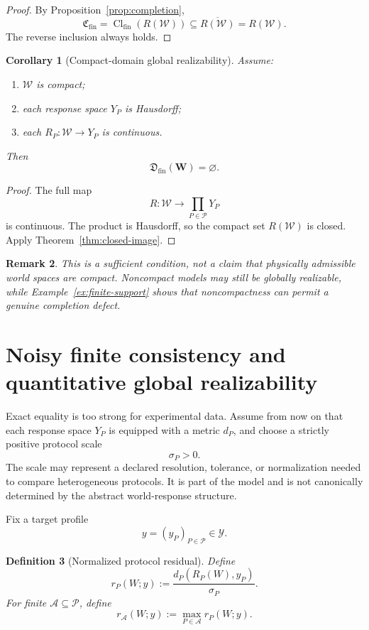 \documentclass[11pt]{article}
\newtheorem{definition}{Definition}[section]
\newtheorem{corollary}[definition]{Corollary}
\newtheorem{remark}[definition]{Remark}
\newcommand{\W}{\mathcal W}
\newcommand{\Pcal}{\mathcal P}
\newcommand{\Acal}{\mathcal A}
\newcommand{\Y}{\mathcal Y}
\newcommand{\Cfin}{\mathfrak C_{\mathrm{fin}}}
\newcommand{\Dfin}{\mathfrak D_{\mathrm{fin}}}
\begin{document}
\begin{proof}
By Proposition~\ref{prop:completion},
\[
\Cfin=\operatorname{Cl}_{\mathrm{fin}}(R(\W))
\subseteq
\overline{R(\W)}
=
R(\W).
\]
The reverse inclusion always holds.
\end{proof}

\begin{corollary}[Compact-domain global realizability]\label{cor:compact}
Assume:
\begin{enumerate}[label=(\roman*)]
\item $\W$ is compact;
\item each response space $Y_P$ is Hausdorff;
\item each $R_P:\W\to Y_P$ is continuous.
\end{enumerate}
Then
\[
\Dfin(\mathbf W)=\varnothing.
\]
\end{corollary}

\begin{proof}
The full map
\[
R:\W\to\prod_{P\in\Pcal}Y_P
\]
is continuous. The product is Hausdorff, so the compact set $R(\W)$ is closed.
Apply Theorem~\ref{thm:closed-image}.
\end{proof}

\begin{remark}
This is a sufficient condition, not a claim that physically admissible world
spaces are compact. Noncompact models may still be globally realizable, while
Example~\ref{ex:finite-support} shows that noncompactness can permit a genuine
completion defect.
\end{remark}


\section{Noisy finite consistency and quantitative global realizability}

Exact equality is too strong for experimental data. Assume from now on that
each response space $Y_P$ is equipped with a metric $d_P$, and choose a
strictly positive protocol scale
\[
\sigma_P>0.
\]
The scale may represent a declared resolution, tolerance, or normalization
needed to compare heterogeneous protocols. It is part of the model and is not
canonically determined by the abstract world-response structure.

Fix a target profile
\[
y=(y_P)_{P\in\Pcal}\in\Y.
\]

\begin{definition}[Normalized protocol residual]
Define
\[
r_P(W;y)
:=
\frac{d_P(R_P(W),y_P)}{\sigma_P}.
\]
For finite $\Acal\subseteq\Pcal$, define
\[
r_{\Acal}(W;y)
:=
\max_{P\in\Acal}r_P(W;y).
\]
\end{definition}
\end{document}
